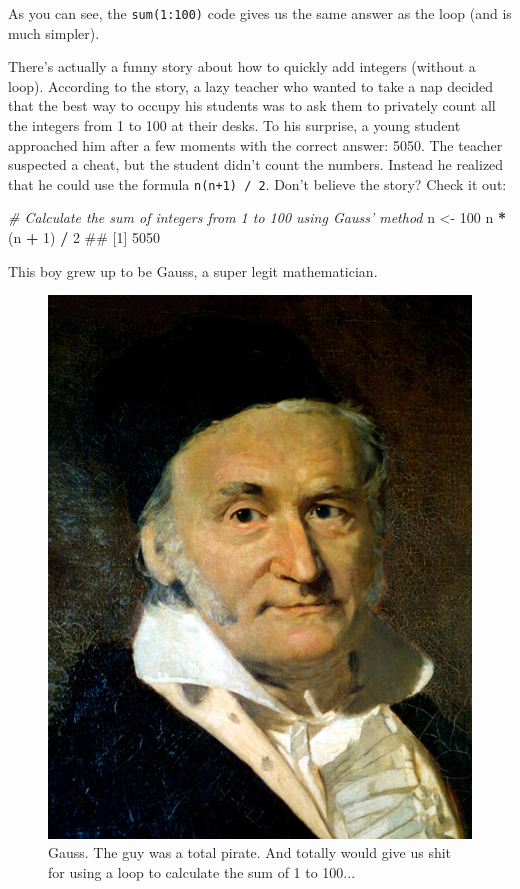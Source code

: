 \documentclass[]{book}
\newenvironment{Shaded}{\begin{snugshade}}{\end{snugshade}}
\newcommand{\DecValTok}[1]{\textcolor[rgb]{0.00,0.00,0.81}{#1}}
\newcommand{\StringTok}[1]{\textcolor[rgb]{0.31,0.60,0.02}{#1}}
\newcommand{\CommentTok}[1]{\textcolor[rgb]{0.56,0.35,0.01}{\textit{#1}}}
\newcommand{\OperatorTok}[1]{\textcolor[rgb]{0.81,0.36,0.00}{\textbf{#1}}}
\newcommand{\NormalTok}[1]{#1}
\theoremstyle{definition}
\theoremstyle{definition}
\theoremstyle{remark}
\begin{document}
As you can see, the \texttt{sum(1:100)} code gives us the same answer as
the loop (and is much simpler).

There's actually a funny story about how to quickly add integers
(without a loop). According to the story, a lazy teacher who wanted to
take a nap decided that the best way to occupy his students was to ask
them to privately count all the integers from 1 to 100 at their desks.
To his surprise, a young student approached him after a few moments with
the correct answer: 5050. The teacher suspected a cheat, but the student
didn't count the numbers. Instead he realized that he could use the
formula \texttt{n(n+1)\ /\ 2}. Don't believe the story? Check it out:

\begin{Shaded}
\begin{Highlighting}[]
\CommentTok{# Calculate the sum of integers from 1 to 100 using Gauss' method}
\NormalTok{n <-}\StringTok{ }\DecValTok{100}
\NormalTok{n }\OperatorTok{*}\StringTok{ }\NormalTok{(n }\OperatorTok{+}\StringTok{ }\DecValTok{1}\NormalTok{) }\OperatorTok{/}\StringTok{ }\DecValTok{2}
\NormalTok{## [1] 5050}
\end{Highlighting}
\end{Shaded}

This boy grew up to be Gauss, a super legit mathematician.

\begin{figure}

{\centering \includegraphics[width=0.6\linewidth]{images/gauss} 

}

\caption{Gauss. The guy was a total pirate. And totally would give us shit for using a loop to calculate the sum of 1 to 100...}\label{fig:unnamed-chunk-474}
\end{figure}
\end{document}
